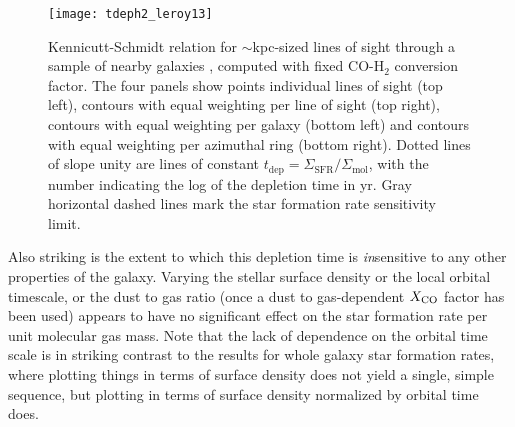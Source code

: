 \begin{figure}
\texttt{[image: tdeph2\_leroy13]}
\caption[Kennicutt-Schmidt relation for galaxies resolved at $\sim$kpc scales]{
\label{fig:tdeph2_leroy13}
Kennicutt-Schmidt relation for $\sim$kpc-sized lines of sight through a sample of nearby galaxies \citep{leroy13a}, computed with fixed CO-H$_2$ conversion factor. The four panels show points individual lines of sight (top left), contours with equal weighting per line of sight (top right), contours with equal weighting per galaxy (bottom left) and contours with equal weighting per azimuthal ring (bottom right). Dotted lines of slope unity are lines of constant $t_{\mathrm{dep}} = \Sigma_{\mathrm{SFR}} / \Sigma_{\mathrm{mol}}$, with the number indicating the log of the depletion time in yr. Gray horizontal dashed lines mark the star formation rate sensitivity limit.
}
\end{figure}

Also striking is the extent to which this depletion time is \textit{in}sensitive to any other properties of the galaxy.  Varying the stellar surface density or the local orbital timescale, or the dust to gas ratio (once a dust to gas-dependent $X_{\rm CO}$ factor has been used) appears to have no significant effect on the star formation rate per unit molecular gas mass. Note that the lack of dependence on the orbital time scale is in striking contrast to the results for whole galaxy star formation rates, where plotting things in terms of surface density does not yield a single, simple sequence, but plotting in terms of surface density normalized by orbital time does.

